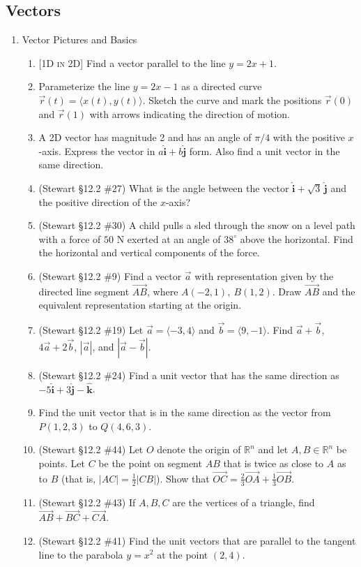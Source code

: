 \documentclass[12pt]{article}
\newcommand{\ihat}{\hat{\textbf{i}}}
\newcommand{\jhat}{\hat{\textbf{j}}}
\newcommand{\khat}{\hat{\textbf{k}}}
\newcommand{\dimtag}[1]{{\footnotesize\textsc{[#1]}}\;}
\newcounter{topic}
\begin{document}
\subsection*{Vectors}
\begin{enumerate}\setcounter{enumi}{\value{topic}}

\item Vector Pictures and Basics
    \begin{enumerate}
        \item \dimtag{1D in 2D} Find a vector parallel to the line $y=2x+1$.
        \item Parameterize the line $y = 2x - 1$ as a directed curve $\vec{r}(t) = \langle x(t), y(t) \rangle$. Sketch the curve and mark the positions $\vec{r}(0)$ and $\vec{r}(1)$ with arrows indicating the direction of motion.
        \item A 2D vector has magnitude 2 and has an angle of $\pi/4$ with the positive $x$-axis. Express the vector in $a \ihat + b \jhat$ form. Also find a unit vector in the same direction.
        \item (Stewart \S12.2 \#27) What is the angle between the vector $\ihat + \sqrt{3}\,\jhat$ and the positive direction of the $x$-axis?
        \item (Stewart \S12.2 \#30) A child pulls a sled through the snow on a level path with a force of $50$ N exerted at an angle of $38^\circ$ above the horizontal. Find the horizontal and vertical components of the force.
        \item (Stewart \S12.2 \#9) Find a vector $\vec{a}$ with representation given by the directed line segment $\overrightarrow{AB}$, where $A(-2,1),\ B(1,2)$. Draw $\overrightarrow{AB}$ and the equivalent representation starting at the origin.
        \item (Stewart \S12.2 \#19) Let $\vec{a}=\langle -3,4\rangle$ and $\vec{b}=\langle 9,-1\rangle$. Find $\vec{a}+\vec{b}$, $4\vec{a}+2\vec{b}$, $|\vec{a}|$, and $|\vec{a}-\vec{b}|$.
        \item (Stewart \S12.2 \#24) Find a unit vector that has the same direction as $-5\ihat + 3\jhat - \khat$.
        \item Find the unit vector that is in the same direction as the vector from $P(1, 2, 3)$ to $Q(4, 6, 3)$.
        \item (Stewart \S12.2 \#44) Let $O$ denote the origin of $\mathbb{R}^n$ and let $A,B \in \mathbb{R}^n$ be points. Let $C$ be the point on segment $AB$ that is twice as close to $A$ as to $B$ (that is, $|AC| = \tfrac{1}{2}|CB|$). Show that $\vec{OC} = \tfrac{2}{3}\vec{OA} + \tfrac{1}{3}\vec{OB}$.
        \item (Stewart \S12.2 \#43) If $A,B,C$ are the vertices of a triangle, find $\overrightarrow{AB} + \overrightarrow{BC} + \overrightarrow{CA}$.
        \item (Stewart \S12.2 \#41) Find the unit vectors that are parallel to the tangent line to the parabola $y = x^2$ at the point $(2,4)$.


\end{enumerate}
\end{enumerate}
\end{document}
